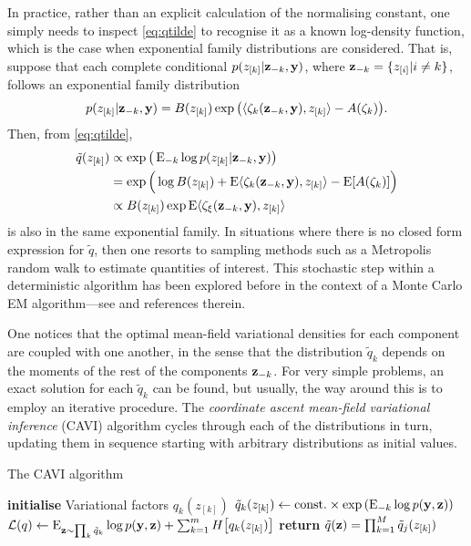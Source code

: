 In practice, rather than an explicit calculation of the normalising constant, one simply needs to inspect \cref{eq:qtilde} to recognise it as a known log-density function, which is the case when exponential family distributions are considered.
That is, suppose that each complete conditional $p(z_{[k]}|{\mathbf z}_{-k}, {\mathbf y})$, where ${\mathbf z}_{-k} = \{z_{[i]} | i \neq k\}$, follows an exponential family distribution
\[
  p(z_{[k]}| {\mathbf z}_{-k}, {\mathbf y} ) 
  = B(z_{[k]})\exp \big(\langle\zeta_k({\mathbf z}_{-k}, {\mathbf y}) , z_{[k]}\rangle - A(\zeta_k) \big).
\]
Then, from \cref{eq:qtilde},
\begin{align*}
  \tilde q(z_{[k]})
  &\propto \exp\big(\operatorname{E}_{-k}\log p(z_{[k]}| {\mathbf z}_{-k}, {\mathbf y}) \big) \\
  &= \exp \Big(\log B(z_{[k]}) + \operatorname{E} \langle\zeta_k({\mathbf z}_{-k}, {\mathbf y}) , z_{[k]}\rangle - \operatorname{E} [ A(\zeta_k) ] \Big) \\
  &\propto B(z_{[k]})\exp \operatorname{E}\langle\zeta_\xi({\mathbf z}_{-k}, {\mathbf y}) , z_{[k]}\rangle
\end{align*}
is also in the same exponential family.
In situations where there is no closed form expression for $\tilde q$, then one resorts to sampling methods such as a Metropolis random walk to estimate quantities of interest.
This stochastic step within a deterministic algorithm has been explored before in the context of a Monte Carlo EM algorithm---see \citet[§4, pp. 537--538]{meng1997algorithm} and references therein.

One notices that the optimal mean-field variational densities for each component are coupled with one another, in the sense that the distribution $\tilde q_k$ depends on the moments of the rest of the components ${\mathbf z}_{-k}$.
For very simple problems, an exact solution for each $\tilde q_k$ can be found, but usually, the way around this is to employ an iterative procedure.
The \emph{coordinate ascent mean-field variational inference} (CAVI) algorithm cycles through each of the distributions in turn, updating them in sequence starting with arbitrary distributions as initial values.

\begin{algorithm}[H]
\caption{The CAVI algorithm}\label{alg:cavi}
  \begin{algorithmic}[1]
    \State \textbf{initialise} Variational factors $q_k(z_{[k]})$
        \State $\tilde q_k(z_{[k]}) \gets \text{const.}\hspace{0.01em} \times \exp \left( \operatorname{E}_{-k}\log p({\mathbf y},{\mathbf z}) \right)$ 
      \EndFor
      \State ${\mathcal L}(q) \gets \operatorname{E}_{{\mathbf z} \sim \prod_k\tilde q_k}\log p({\mathbf y}, {\mathbf z}) + \sum_{k=1}^m H\big[ q_k(z_{[k]})\big]$ 
    \EndWhile
    \State \textbf{return} $\tilde q({\mathbf z}) = \prod_{k=1}^M \tilde q_j(z_{[k]})$ 
  \end{algorithmic}
\end{algorithm}

